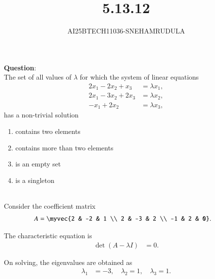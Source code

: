 \documentclass[journal]{IEEEtran}
\begin{document}

\vspace{3cm}

\title{5.13.12}
\author{AI25BTECH11036-SNEHAMRUDULA}
 \maketitle
{\let\newpage\relax\maketitle}
\renewcommand{\thefigure}{\theenumi}
\renewcommand{\thetable}{\theenumi}
\setlength{\intextsep}{10pt} 
\renewcommand{\thetable}{\theenumi}
\textbf{Question}:\\
The set of all values of $\lambda$ for which the system of linear equations
\[
\begin{aligned}
2x_{1} - 2x_{2} + x_{3} &= \lambda x_{1}, \\[6pt]
2x_{1} - 3x_{2} + 2x_{3} &= \lambda x_{2}, \\[6pt]
- x_{1} + 2x_{2} &= \lambda x_{3},
\end{aligned}
\]
has a non-trivial solution
\begin{enumerate}
  \item[(a)] contains two elements
  \item[(b)] contains more than two elements
  \item[(c)] is an empty set
  \item[(d)] is a singleton
\end{enumerate}

\solution \\
Consider the coefficient matrix
\begin{align}
A &= \myvec{2 & -2 & 1 \\ 2 & -3 & 2 \\ -1 & 2 & 0}.
\end{align}

The characteristic equation is
\begin{align}
\det(A - \lambda I) &= 0.
\end{align}

On solving, the eigenvalues are obtained as
\begin{align}
\lambda_1 &= -3, \quad \lambda_2 = 1, \quad \lambda_3 = 1.
\end{align}
\end{document}
